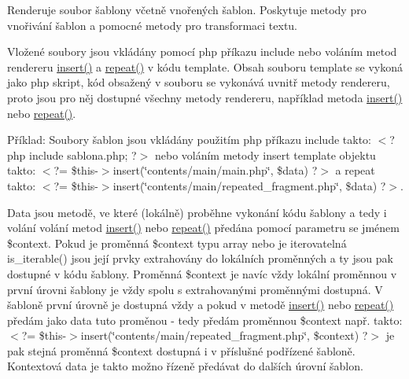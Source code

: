 Renderuje soubor šablony včetně vnořených šablon. Poskytuje metody pro vnořivání šablon a pomocné metody pro transformaci textu.

Vložené soubory jsou vkládány pomocí php příkazu include nebo voláním metod rendereru \mbox{\hyperlink{class_pes_1_1_view_1_1_renderer_1_1_php_renderer_ae62d97adedce8c34fa312e0f63b1df26}{insert()}} a \mbox{\hyperlink{class_pes_1_1_view_1_1_renderer_1_1_php_renderer_a59c2c3bcc551a9d1ccf3b49224c985e3}{repeat()}} v kódu template. Obsah souboru template se vykoná jako php skript, kód obsažený v souboru se vykonává uvnitř metody rendereru, proto jsou pro něj dostupné všechny metody rendereru, například metoda \mbox{\hyperlink{class_pes_1_1_view_1_1_renderer_1_1_php_renderer_ae62d97adedce8c34fa312e0f63b1df26}{insert()}} nebo \mbox{\hyperlink{class_pes_1_1_view_1_1_renderer_1_1_php_renderer_a59c2c3bcc551a9d1ccf3b49224c985e3}{repeat()}}.

Příklad\+: Soubory šablon jsou vkládány použitím php příkazu include takto\+: {\ttfamily $<$?php include sablona.\+php; ?$>$} nebo voláním metody insert template objektu takto\+: {\ttfamily $<$?= \$this-\/$>$insert(\char`\"{}contents/main/main.\+php\char`\"{}, \$data) ?$>$} a repeat takto\+: {\ttfamily $<$?= \$this-\/$>$insert(\char`\"{}contents/main/repeated\+\_\+fragment.\+php\char`\"{}, \$data) ?$>$}.

Data jsou metodě, ve které (lokálně) proběhne vykonání kódu šablony a tedy i volání volání metod \mbox{\hyperlink{class_pes_1_1_view_1_1_renderer_1_1_php_renderer_ae62d97adedce8c34fa312e0f63b1df26}{insert()}} nebo \mbox{\hyperlink{class_pes_1_1_view_1_1_renderer_1_1_php_renderer_a59c2c3bcc551a9d1ccf3b49224c985e3}{repeat()}} předána pomocí parametru se jménem \$context. Pokud je proměnná \$context typu array nebo je iterovatelná is\+\_\+iterable() jsou její prvky extrahovány do lokálních proměnných a ty jsou pak dostupné v kódu šablony. Proměnná \$context je navíc vždy lokální proměnnou v první úrovni šablony je vždy spolu s extrahovanými proměnnými dostupná. V šabloně první úrovně je dostupná vždy a pokud v metodě \mbox{\hyperlink{class_pes_1_1_view_1_1_renderer_1_1_php_renderer_ae62d97adedce8c34fa312e0f63b1df26}{insert()}} nebo \mbox{\hyperlink{class_pes_1_1_view_1_1_renderer_1_1_php_renderer_a59c2c3bcc551a9d1ccf3b49224c985e3}{repeat()}} předám jako data tuto proměnou -\/ tedy předám proměnnou \$context např. takto\+: {\ttfamily $<$?= \$this-\/$>$insert(\char`\"{}contents/main/repeated\+\_\+fragment.\+php\char`\"{}, \$context) ?$>$} je pak stejná proměnná \$context dostupná i v příslušné podřízené šabloně. Kontextová data je takto možno řízeně předávat do dalších úrovní šablon. 

